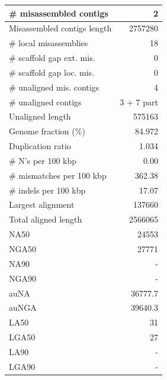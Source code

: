 \documentclass[12pt,a4paper]{article}
\begin{document}
\begin{table}[ht]
\begin{center}
\begin{tabular}{|l*{1}{|r}|}
\# misassembled contigs & 2 \\ \hline
Misassembled contigs length & 2757280 \\ \hline
\# local misassemblies & 18 \\ \hline
\# scaffold gap ext. mis. & 0 \\ \hline
\# scaffold gap loc. mis. & 0 \\ \hline
\# unaligned mis. contigs & 4 \\ \hline
\# unaligned contigs & 3 + 7 part \\ \hline
Unaligned length & 575163 \\ \hline
Genome fraction (\%) & 84.972 \\ \hline
Duplication ratio & 1.034 \\ \hline
\# N's per 100 kbp & 0.00 \\ \hline
\# mismatches per 100 kbp & 362.38 \\ \hline
\# indels per 100 kbp & 17.07 \\ \hline
Largest alignment & 137660 \\ \hline
Total aligned length & 2566065 \\ \hline
NA50 & 24553 \\ \hline
NGA50 & 27771 \\ \hline
NA90 & - \\ \hline
NGA90 & - \\ \hline
auNA & 36777.7 \\ \hline
auNGA & 39640.3 \\ \hline
LA50 & 31 \\ \hline
LGA50 & 27 \\ \hline
LA90 & - \\ \hline
LGA90 & - \\ \hline
\end{tabular}
\end{center}
\end{table}
\end{document}
